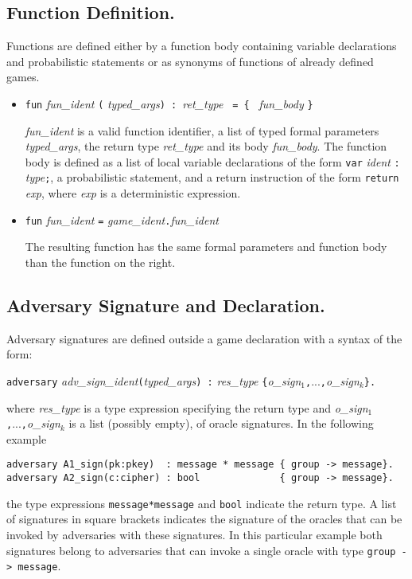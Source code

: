\subsection{Function Definition.}

Functions are defined either by a function body containing variable
declarations and probabilistic statements or as synonyms of functions
of already defined games.

\begin{itemize}
\item 
\verb+fun+ \textit{fun_ident} \verb+(+%
\textit{typed_args}\verb+) : +\textit{ret_type} \verb+ = { +%
\textit{fun_body} \verb+}+

\textit{fun_ident} is a valid function identifier, a list of typed
formal parameters \textit{typed_args}, the return type
\textit{ret_type} and its body \textit{fun_body}. The function body is
defined as a list of local variable declarations of the form
%
\verb+var+ \textit{ident} \verb+:+ \textit{type}\verb+;+, a
%
probabilistic statement, and a return instruction of the form
\verb+return+ \textit{exp}, where \textit{exp} is a deterministic
expression.

\item
\verb+fun+ \textit{fun_ident} \verb+=+ \textit{game_ident}\verb+.+\textit{fun_ident}

The resulting function has the same formal parameters and function
body than the function on the right.
\end{itemize}


\subsection{Adversary Signature and Declaration.}
Adversary signatures are defined outside a game declaration with a
syntax of the form:

\verb+adversary+
\textit{adv_sign_ident}\verb+(+\textit{typed_args}\verb+) :+
\textit{res_type} \verb+{+\textit{o_sign}${}_1$\verb+,+...\verb+,+\textit{o_sign}${}_k$\verb+}.+

\noindent
where \textit{res_type} is a type expression specifying the return
type and \textit{o_sign}${}_1$\verb+,+...\verb+,+\textit{o_sign}${}_k$
is a list (possibly empty), of oracle signatures.
In the following example
\begin{verbatim}
adversary A1_sign(pk:pkey)  : message * message { group -> message}.
adversary A2_sign(c:cipher) : bool              { group -> message}.
\end{verbatim}
the type expressions \verb|message*message| and \verb|bool| indicate
the return type. A list of signatures in square brackets indicates the
signature of the oracles that can be invoked by adversaries with these
signatures. In this particular example both signatures belong to
adversaries that can invoke a single oracle with type
\verb|group -> message|.

